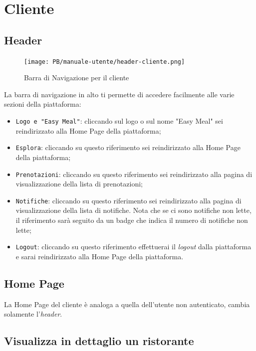 \section{Cliente}

\subsection{Header}

\begin{figure}[htbp]
    \centering
	\texttt{[image: PB/manuale-utente/header-cliente.png]}
    \caption{Barra di Navigazione per il cliente}
\end{figure}

La barra di navigazione in alto ti permette di accedere facilmente alle varie 
sezioni della piattaforma:
\begin{itemize}
	\item \texttt{Logo e "Easy Meal"}: cliccando sul logo o sul nome "Easy Meal"
		sei reindirizzato alla Home Page della piattaforma;

	\item \texttt{Esplora}: cliccando su questo riferimento sei reindirizzato
		alla Home Page della piattaforma;

	\item \texttt{Prenotazioni}: cliccando su questo riferimento sei 
		reindirizzato alla pagina di visualizzazione della lista di
		prenotazioni;

	\item \texttt{Notifiche}: cliccando su questo riferimento sei reindirizzato
		alla pagina di visualizzazione della lista di notifiche. Nota che se ci
		sono notifiche non lette, il riferimento sarà seguito da un badge che
		indica il numero di notifiche non lette;

	\item \texttt{Logout}: cliccando su questo riferimento effettuerai il \textit{logout}
		dalla piattaforma e sarai reindirizzato alla Home Page della 
		piattaforma.
\end{itemize}

\subsection{Home Page}

La Home Page del cliente è analoga a quella dell'utente non autenticato, cambia
solamente l'\textit{header}.

\subsection{Visualizza in dettaglio un ristorante}

